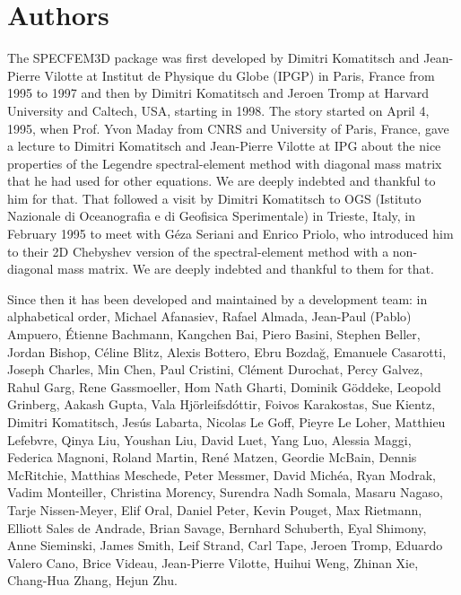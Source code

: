 \section*{Authors}

\noindent The SPECFEM3D package was first developed by Dimitri
Komatitsch and Jean-Pierre Vilotte at Institut de Physique du Globe
(IPGP) in Paris, France from 1995 to 1997 and then by Dimitri Komatitsch
and Jeroen Tromp at Harvard University and Caltech, USA, starting in 1998.
The story started on April 4, 1995, when Prof. Yvon Maday from CNRS and University of Paris, France, gave a lecture to
Dimitri Komatitsch and Jean-Pierre Vilotte at IPG about the nice properties of the Legendre spectral-element method with diagonal mass matrix that he had used for
other equations. We are deeply indebted and thankful to him for that.
That followed a visit by Dimitri Komatitsch to OGS (Istituto Nazionale di Oceanografia e di Geofisica Sperimentale) in Trieste, Italy, in February 1995
to meet with G\'eza Seriani and Enrico Priolo, who introduced him to their 2D Chebyshev version of the spectral-element method with a non-diagonal mass matrix.
We are deeply indebted and thankful to them for that.\newline


Since then it has been developed and maintained by a development team: in alphabetical order,
Michael Afanasiev,
Rafael Almada,
Jean-Paul (Pablo) Ampuero,
\'Etienne Bachmann,
Kangchen Bai,
Piero Basini,
Stephen Beller,
Jordan Bishop,
C\'eline Blitz,
Alexis Bottero,
Ebru Bozda\u{g},
Emanuele Casarotti,
Joseph Charles,
Min Chen,
Paul Cristini,
Cl\'ement Durochat,
Percy Galvez,
Rahul Garg,
Rene Gassmoeller,
Hom Nath Gharti,
Dominik G\"oddeke,
Leopold Grinberg,
Aakash Gupta,
Vala Hj\"orleifsd\'ottir,
Foivos Karakostas,
Sue Kientz,
Dimitri Komatitsch,
Jes\'us Labarta,
Nicolas Le Goff,
Pieyre Le Loher,
Matthieu Lefebvre,
Qinya Liu,
Youshan Liu,
David Luet,
Yang Luo,
Alessia Maggi,
Federica Magnoni,
Roland Martin,
Ren\'e Matzen,
Geordie McBain,
Dennis McRitchie,
Matthias Meschede,
Peter Messmer,
David Mich\'ea,
Ryan Modrak,
Vadim Monteiller,
Christina Morency,
Surendra Nadh Somala,
Masaru Nagaso,
Tarje Nissen-Meyer,
Elif Oral,
Daniel Peter,
Kevin Pouget,
Max Rietmann,
Elliott Sales de Andrade,
Brian Savage,
Bernhard Schuberth,
Eyal Shimony,
Anne Sieminski,
James Smith,
Leif Strand,
Carl Tape,
Jeroen Tromp,
Eduardo Valero Cano,
Brice Videau,
Jean-Pierre Vilotte,
Huihui Weng,
Zhinan Xie,
Chang-Hua Zhang,
Hejun Zhu.\newline

